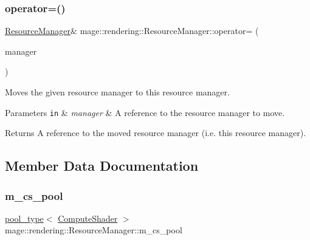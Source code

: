 \subsubsection{\texorpdfstring{operator=()}{operator=()}\hspace{0.1cm}{\footnotesize\ttfamily [2/2]}}
{\footnotesize\ttfamily \hyperlink{classmage_1_1rendering_1_1_resource_manager}{Resource\+Manager}\& mage\+::rendering\+::\+Resource\+Manager\+::operator= (\begin{DoxyParamCaption}\item[{\hyperlink{classmage_1_1rendering_1_1_resource_manager}{Resource\+Manager} \&\&}]{manager }\end{DoxyParamCaption})\hspace{0.3cm}{\ttfamily [delete]}}

Moves the given resource manager to this resource manager.


\begin{DoxyParams}[1]{Parameters}
\mbox{\tt in}  & {\em manager} & A reference to the resource manager to move. \\
\hline
\end{DoxyParams}
\begin{DoxyReturn}{Returns}
A reference to the moved resource manager (i.\+e. this resource manager). 
\end{DoxyReturn}


\subsection{Member Data Documentation}
\hypertarget{classmage_1_1rendering_1_1_resource_manager_ae0433b0866f523c3c0e6e22197aea86f}{}\label{classmage_1_1rendering_1_1_resource_manager_ae0433b0866f523c3c0e6e22197aea86f} 
\subsubsection{\texorpdfstring{m\+\_\+cs\+\_\+pool}{m\_cs\_pool}}
{\footnotesize\ttfamily \hyperlink{classmage_1_1rendering_1_1_resource_manager_ab21a4e280087032ee533f267bd9bf602}{pool\+\_\+type}$<$ \hyperlink{namespacemage_1_1rendering_aa67e55ba4dca44d39b0367b31f091863}{Compute\+Shader} $>$ mage\+::rendering\+::\+Resource\+Manager\+::m\+\_\+cs\+\_\+pool\hspace{0.3cm}{\ttfamily [private]}}

